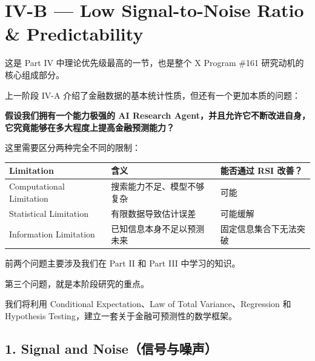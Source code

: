 \hypertarget{part-4-60-0001-iv-b-low-signal-to-noise-ratio-predictability}{%
\section{IV-B --- Low Signal-to-Noise Ratio \& Predictability}\label{part-4-60-0001-iv-b-low-signal-to-noise-ratio-predictability}}

这是 Part IV 中理论优先级最高的一节，也是整个 X Program \#161 研究动机的核心组成部分。

上一阶段 IV-A 介绍了金融数据的基本统计性质，但还有一个更加本质的问题：

\textbf{假设我们拥有一个能力极强的 AI Research Agent，并且允许它不断改进自身，它究竟能够在多大程度上提高金融预测能力？}

这里需要区分两种完全不同的限制：

\begin{readertable}
\begin{longtable}[]{@{}
  >{\raggedright\arraybackslash}p{}
  >{\raggedright\arraybackslash}p{}
  >{\raggedright\arraybackslash}p{}@{}}
\toprule
Limitation & 含义 & 能否通过 RSI 改善？ \\
\midrule
\endhead
Computational Limitation & 搜索能力不足、模型不够复杂 & 可能 \\
Statistical Limitation & 有限数据导致估计误差 & 可能缓解 \\
Information Limitation & 已知信息本身不足以预测未来 & 固定信息集合下无法突破 \\
\bottomrule
\end{longtable}
\end{readertable}

前两个问题主要涉及我们在 Part II 和 Part III 中学习的知识。

第三个问题，就是本阶段研究的重点。

我们将利用 Conditional Expectation、Law of Total Variance、Regression 和 Hypothesis Testing，建立一套关于金融可预测性的数学框架。

\hypertarget{part-4-60-0001-signal-and-noiseux4fe1ux53f7ux4e0eux566aux58f0}{%
\subsection{1. Signal and Noise（信号与噪声）}\label{part-4-60-0001-signal-and-noiseux4fe1ux53f7ux4e0eux566aux58f0}}

